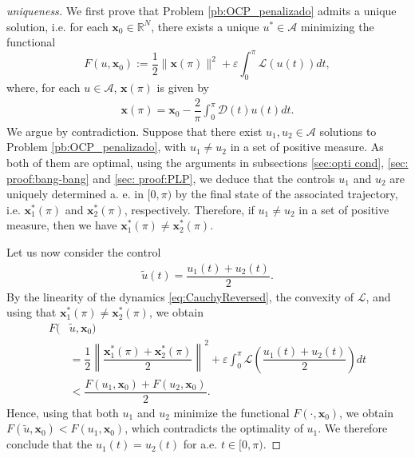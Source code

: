 \documentclass[twocolumn]{autart}    %
\begin{document}
\medskip
\begin{proof}[uniqueness]
	We first prove that Problem \ref{pb:OCP_penalizado} admits a unique solution, i.e.  for each $\bm{x}_0\in \mathbb{R}^N$, there exists a unique $u^\ast\in \mathcal{A}$ minimizing the functional
	\begin{equation}\label{eq:functional F}
		F(u,\bm{x}_0) := \dfrac{1}{2} \| \bm{x}(\pi) \|^2 + \varepsilon \int_0^\pi \mathcal{L}(u(t)) dt,
	\end{equation}
	where,  for each $u\in \mathcal{A}$, $\bm{x}(\pi)$ is given by
	\begin{align*}
		\bm{x} (\pi) = \bm{x}_0  - \dfrac{2}{\pi} \int_0^\pi \bm{\mathcal{D}}(t) u(t) dt.
	\end{align*}
	We argue by contradiction. Suppose that there exist $u_1,u_2\in\mathcal{A}$ solutions to Problem \ref{pb:OCP_penalizado}, with $u_1\neq u_2$ in a set of positive measure. As both of them are optimal, using the arguments in subsections \ref{sec:opti cond}, \ref{sec: proof:bang-bang} and \ref{sec: proof:PLP}, we deduce that the controls $u_1$ and $u_2$ are uniquely determined a. e. in $[0,\pi)$ by the final state of the associated trajectory, i.e. $\bm{x}_1^\ast(\pi)$ and $\bm{x}_2^\ast(\pi)$, respectively. Therefore,   if $u_1 \neq u_2$ in a set of positive measure, then we have $\bm{x}_1^\ast (\pi)\neq \bm{x}_2^\ast(\pi)$.
	
	Let us now consider the control
	\begin{align*}
		\tilde{u} (t) = \dfrac{u_1(t) + u_2(t)}{2}.
	\end{align*}
	By the linearity of the dynamics \eqref{eq:CauchyReversed}, the convexity of $\mathcal{L}$, and using that $\bm{x}_1^\ast(\pi) \neq \bm{x}_2^\ast(\pi)$, we obtain
	\begin{align*} 
		F(&\tilde{u}, \bm{x}_0) 
		\\
		&= \dfrac{1}{2} \left\| \dfrac{\bm{x}_1^\ast(\pi) + \bm{x}_2^\ast(\pi) }{2}\right\|^2 \!+ \varepsilon \int_0^\pi \mathcal{L} \left( \dfrac{u_1(t) + u_2(t) }{2}\right) dt \nonumber 
		\\[5pt]
		&< \dfrac{F(u_1,\bm{x}_0) + F(u_2, \bm{x}_0)}{2}. 
	\end{align*}
	Hence, using that both $u_1$ and $u_2$ minimize the functional $F(\cdot, \bm{x}_0)$, we obtain $F(\tilde{u}, \bm{x}_0) < F(u_1,\bm{x}_0)$, which contradicts the optimality of $u_1$. We therefore conclude that the $u_1 (t) =u_2(t)$ for a.e. $t\in [0,\pi)$.
\end{proof}
\end{document}
